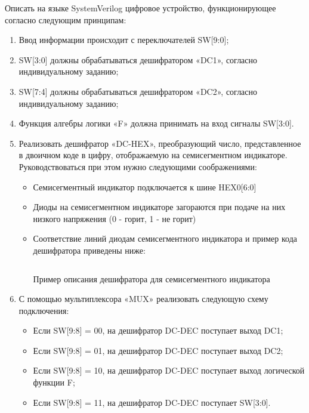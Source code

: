 \par{Описать на языке SystemVerilog цифровое устройство, функционирующее согласно следующим принципам:}
\begin{enumerate}
  \item Ввод информации происходит с переключателей SW[9:0];
  \item SW[3:0] должны обрабатываться дешифратором «DC1», согласно индивидуальному заданию;
  \item SW[7:4] должны обрабатываться дешифратором «DC2», согласно индивидуальному заданию;
  \item Функция алгебры логики «F» должна принимать на вход сигналы SW[3:0].

  \item Реализовать дешифратор «DC-HEX», преобразующий число, представленное в двоичном коде в цифру, отображаемую на семисегментном индикаторе. Руководствоваться при этом нужно следующими соображениями:
    \begin{itemize}
      \item Семисегментный индикатор подключается к шине HEX0[6:0]
      \item Диоды на семисегментном индикаторе загораются при подаче на них низкого напряжения (0 - горит, 1 - не горит)
      \item Соответствие линий диодам семисегментного индикатора и пример кода дешифратора приведены ниже:
        \begin{figure}[H]
          \centering
          \def\svgwidth{3cm}
          
        \end{figure}

        \begin{listing}[H]
          \inputminted{SystemVerilog}{code_examples/lab_1/dc_hex.sv}
          \caption{Пример описания дешифратора для семисегментного индикатора}
        \end{listing}


    \end{itemize}
    \item С помощью мультиплексора «MUX» реализовать следующую схему подключения:
      \begin{itemize}
        \item Если SW[9:8] = 00, на дешифратор DC-DEC поступает выход DC1;
        \item Если SW[9:8] = 01, на дешифратор DC-DEC поступает выход DC2;
        \item Если SW[9:8] = 10, на дешифратор DC-DEC поступает выход логической функции F;
        \item Если SW[9:8] = 11, на дешифратор DC-DEC поступает SW[3:0].
      \end{itemize}
\end{enumerate}



